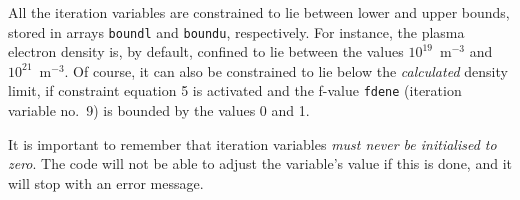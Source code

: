 \documentclass[11pt,a4paper]{report}
\begin{document}
All the iteration variables are constrained to lie between lower and upper
bounds, stored in arrays \texttt{boundl} and \texttt{boundu},
respectively. For instance, the plasma electron density is, by default,
confined to lie between the values $10^{19}$~m$^{-3}$ and
$10^{21}$~m$^{-3}$. Of course, it can also be constrained to lie below the
\textit{calculated}\/ density limit, if constraint equation 5 is activated and
the f-value \texttt{fdene} (iteration variable no.\ 9) is bounded by the
values 0 and 1.

It is important to remember that iteration variables \textit{must never be
initialised to zero}. The code will not be able to adjust the variable's value
if this is done, and it will stop with an error message.

\end{document}
